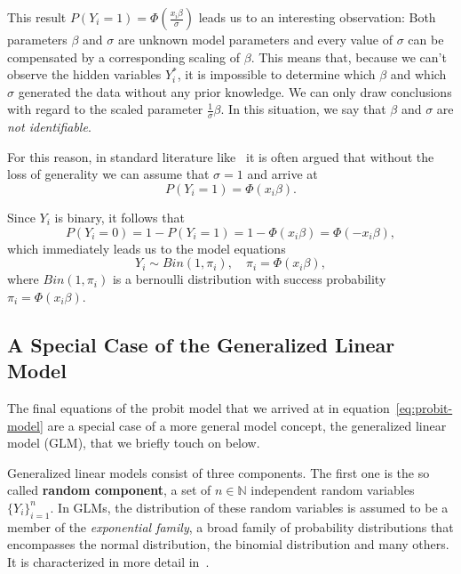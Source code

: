 \noindent This result $P(Y_i = 1) = \Phi\left(\frac{x_i \beta}{\sigma} \right)$
leads us to an interesting observation:
Both parameters $\beta$ and $\sigma$ are unknown model parameters and
every value of $\sigma$ can be compensated by a corresponding scaling
of $\beta$. This means that, because we can't observe the hidden variables $Y_i^\ast$,
it is impossible to determine which $\beta$ and which $\sigma$
generated the data without any prior knowledge.
We can only draw conclusions with regard to the
scaled parameter $\frac{1}{\sigma}\beta$.
In this situation, we say that $\beta$ and $\sigma$ are
\textit{not identifiable}.

For this reason, in standard literature like~\cite{regression-fahrmeir} it is
often argued that without the loss of generality we can assume that
$\sigma = 1$ and arrive at
\begin{equation}
    P(Y_i = 1) = \Phi(x_i \beta).
\end{equation}

\noindent{}Since $Y_i$ is binary, it follows that
\begin{equation*}
    P(Y_i = 0) = 1 - P(Y_i = 1) = 1 - \Phi(x_i \beta) = \Phi(-x_i \beta),
\end{equation*}
which immediately leads us to the model equations
\begin{equation}
    \label{eq:probit-model}
    Y_i \sim Bin(1, \pi_i), \quad \pi_i = \Phi(x_i \beta),
\end{equation}
where $Bin(1, \pi_i)$ is a bernoulli distribution with success
probability $\pi_i = \Phi(x_i \beta)$.

\subsection{A Special Case of the Generalized Linear Model}

The final equations of the probit model that we arrived at
in equation~\ref{eq:probit-model} are a special case of a more
general model concept, the generalized linear model (GLM),
that we briefly touch on below.

Generalized linear models consist of three components.
The first one is the so called \textbf{random component},
a set of $n \in \mathbb{N}$ independent random variables $\{ Y_i \}_{i=1}^n$.
In GLMs, the distribution of these random variables is assumed
to be a member of the \textit{exponential family}, a broad family of
probability distributions that encompasses the normal distribution,
the binomial distribution and many others.
It is characterized in more detail in~\cite{glm-agresti}.

